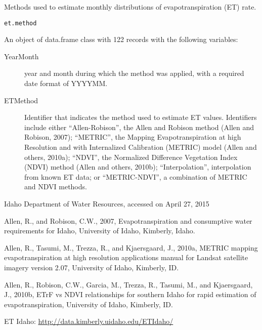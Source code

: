 \documentclass[a4paper]{book}
\begin{document}
%
\begin{Description}\relax
Methods used to estimate monthly distributions of evapotranspiration (ET) rate.
\end{Description}
%
\begin{Usage}
\begin{verbatim}
et.method
\end{verbatim}
\end{Usage}
%
\begin{Format}
An object of data.frame class with 122 records with the following variables:
\begin{description}

\item[YearMonth] year and month during which the method was applied,
with a required date format of YYYYMM.
\item[ETMethod] Identifier that indicates the method used to estimate ET values.
Identifiers include either
``Allen-Robison'', the Allen and Robison method (Allen and Robison, 2007);
``METRIC'', the Mapping Evapotranspiration at high Resolution and with
Internalized Calibration (METRIC) model (Allen and others, 2010a);
``NDVI'', the Normalized Difference Vegetation Index (NDVI) method
(Allen and others, 2010b);
``Interpolation'', interpolation from known ET data; or
``METRIC-NDVI'', a combination of METRIC and NDVI methods.

\end{description}
\end{Format}
%
\begin{Source}\relax
Idaho Department of Water Resources, accessed on April 27, 2015
\end{Source}
%
\begin{References}\relax
Allen, R., and Robison, C.W., 2007, Evapotranspiration and
consumptive water requirements for Idaho, University of Idaho, Kimberly, Idaho.

Allen, R., Tasumi, M., Trezza, R., and Kjaersgaard, J., 2010a,
METRIC mapping evapotranspiration at high resolution applications manual for
Landsat satellite imagery version 2.07, University of Idaho, Kimberly, ID.

Allen, R., Robison, C.W., Garcia, M., Trezza, R., Tasumi, M., and Kjaersgaard, J., 2010b,
ETrF vs NDVI relationships for southern Idaho for rapid estimation of evapotranspiration,
University of Idaho, Kimberly, ID.

ET Idaho: \url{http://data.kimberly.uidaho.edu/ETIdaho/}
\end{References}
\end{document}
